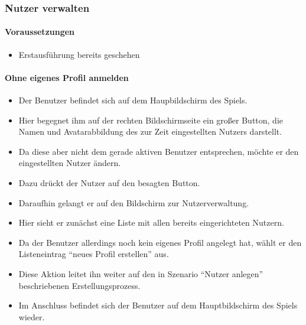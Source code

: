 \subsubsection{Nutzer verwalten}
\paragraph{Voraussetzungen}
\begin{itemize}
\item Erstausführung bereits geschehen
\end{itemize}

\paragraph{Ohne eigenes Profil anmelden}
\begin{itemize}
\item Der Benutzer befindet sich auf dem Haupbildschirm des Spiels.
\item Hier begegnet ihm auf der rechten Bildschirmseite ein großer Button, 
die Namen und Avatarabbildung des zur Zeit eingestellten Nutzers darstellt.
\item Da diese aber nicht dem gerade aktiven Benutzer entsprechen, möchte er den eingestellten Nutzer ändern.
\item Dazu drückt der Nutzer auf den besagten Button.
\item Daraufhin gelangt er auf den Bildschirm zur Nutzerverwaltung.
\item Hier sieht er zunächst eine Liste mit allen bereits 
eingerichteten Nutzern.
\item Da der Benutzer allerdings noch kein eigenes Profil
angelegt hat, wählt er den Listeneintrag "`neues Profil erstellen"' aus.
\item Diese Aktion leitet ihn weiter auf den in Szenario "`Nutzer anlegen"'
beschriebenen Erstellungsprozess.
\item Im Anschluss befindet sich der Benutzer auf dem Hauptbildschirm des Spiels wieder.
\end{itemize}

